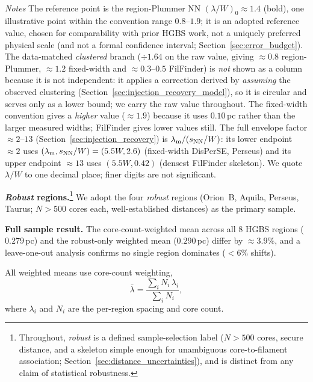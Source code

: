 \documentclass[usenatbib,twoside,twocolumn]{mnras}
\begin{document}
\begin{table}
\begin{tabular}{p{4.2cm}cc}
\bottomrule
\end{tabular}
\\[2pt]
\footnotesize
\emph{Notes} The reference point is the region-Plummer NN $(\lambda/W)_0\approx1.4$ (bold), one illustrative point within the convention range $0.8$--$1.9$; it is an adopted reference value, chosen for comparability with prior HGBS work, not a uniquely preferred physical scale (and not a formal confidence interval; Section~\ref{sec:error_budget}). The data-matched \emph{clustered} branch ($\div1.64$ on the raw value, giving $\approx0.8$ region-Plummer, $\approx1.2$ fixed-width and $\approx0.3$--$0.5$ FilFinder) is \emph{not} shown as a column because it is not independent: it applies a correction derived by \emph{assuming} the observed clustering (Section~\ref{sec:injection_recovery_model}), so it is circular and serves only as a lower bound; we carry the raw value throughout. The fixed-width convention gives a \emph{higher} value ($\approx1.9$) because it uses $0.10$\,pc rather than the larger measured widths; FilFinder gives lower values still. The full envelope factor $\approx2$--$13$ (Section~\ref{sec:injection_recovery}) is $\lambda_{\rm m}/(s_{\rm NN}/W)$: its lower endpoint $\approx2$ uses $(\lambda_{\rm m},s_{\rm NN}/W)=(5.5W,2.6)$ (fixed-width DisPerSE, Perseus) and its upper endpoint $\approx13$ uses $(5.5W,0.42)$ (densest FilFinder skeleton). We quote $\lambda/W$ to one decimal place; finer digits are not significant.
\end{table}

\textbf{\emph{Robust} regions.}\footnote{Throughout, \emph{robust} is a defined sample-selection label ($N>500$ cores, secure distance, and a skeleton simple enough for unambiguous core-to-filament association; Section~\ref{sec:distance_uncertainties}), and is distinct from any claim of statistical robustness.} We adopt the four \emph{robust} regions (Orion~B, Aquila, Perseus, Taurus; $N>500$ cores each, well-established distances) as the primary sample.

\textbf{Full sample result.} The core-count-weighted mean across all 8 HGBS regions ($0.279$\,pc) and the robust-only weighted mean ($0.290$\,pc) differ by $\approx3.9\%$, and a leave-one-out analysis confirms no single region dominates ($<6\%$ shifts).

All weighted means use core-count weighting,
\begin{equation}
\bar{\lambda} = \frac{\sum_i N_i\,\lambda_i}{\sum_i N_i},
\label{eq:weighting}
\end{equation}
where $\lambda_i$ and $N_i$ are the per-region spacing and core count.
\end{document}
